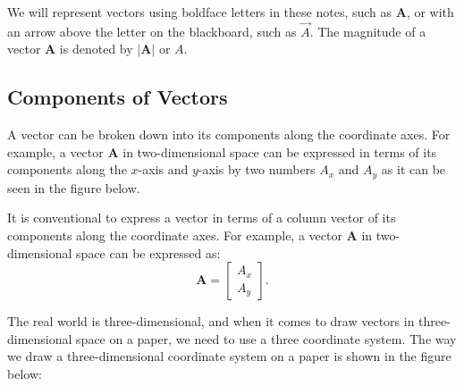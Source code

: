 \documentclass[../main.tex]{subfiles}
\begin{document}
We will represent vectors using boldface letters in these notes, such as \(\mathbf{A}\), or with an arrow above the letter on the blackboard, such as \(\vec{A}\). The magnitude of a vector \(\mathbf{A}\) is denoted by \(|\mathbf{A}|\) or \(A\).

\subsection{Components of Vectors}

A vector can be broken down into its components along the coordinate axes. For example, a vector \(\mathbf{A}\) in two-dimensional space can be expressed in terms of its components along the \(x\)-axis and \(y\)-axis by two numbers \(A_x\) and \(A_y\) as it can be seen in the figure below.


\begin{figure}[h]
\centering
{}
\end{figure}

It is conventional to express a vector in terms of a column vector of its components along the coordinate axes. For example, a vector \(\mathbf{A}\) in two-dimensional space can be expressed as:
\[
\mathbf{A} = \begin{bmatrix} A_x \\ A_y \end{bmatrix}.
\]  


The real world is three-dimensional, and when it comes to draw vectors in three-dimensional space on a paper, we need to use a three coordinate system. The way we draw a three-dimensional coordinate system on a paper is shown in the figure below:

\begin{center}
\end{center}
\end{document}
